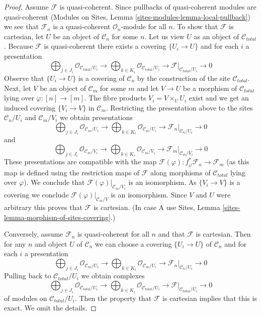 \begin{proof}
Assume $\mathcal{F}$ is quasi-coherent. Since pullbacks of
quasi-coherent modules are quasi-coherent
(Modules on Sites, Lemma \ref{sites-modules-lemma-local-pullback})
we see that $\mathcal{F}_n$ is a quasi-coherent $\mathcal{O}_n$-module
for all $n$. To show that $\mathcal{F}$ is cartesian, let $U$
be an object of $\mathcal{C}_n$ for some $n$. Let us view $U$
as an object of $\mathcal{C}_{total}$. Because $\mathcal{F}$
is quasi-coherent there exists a covering $\{U_i \to U\}$
and for each $i$ a presentation
$$
\bigoplus\nolimits_{j \in J_i} \mathcal{O}_{\mathcal{C}_{total}/U_i} \to
\bigoplus\nolimits_{k \in K_i} \mathcal{O}_{\mathcal{C}_{total}/U_i} \to
\mathcal{F}|_{\mathcal{C}_{total}/U_i} \to 0
$$
Observe that $\{U_i \to U\}$ is a covering of $\mathcal{C}_n$ by
the construction of the site $\mathcal{C}_{total}$.
Next, let $V$ be an object of $\mathcal{C}_m$ for some $m$ and let
$V \to U$ be a morphism of $\mathcal{C}_{total}$ lying over
$\varphi : [n] \to [m]$. The fibre products $V_i = V \times_U U_i$
exist and we get an induced covering $\{V_i \to V\}$ in $\mathcal{C}_m$.
Restricting the presentation above to the sites
$\mathcal{C}_n/U_i$ and $\mathcal{C}_m/V_i$ we obtain
presentations
$$
\bigoplus\nolimits_{j \in J_i} \mathcal{O}_{\mathcal{C}_m/U_i} \to
\bigoplus\nolimits_{k \in K_i} \mathcal{O}_{\mathcal{C}_m/U_i} \to
\mathcal{F}_n|_{\mathcal{C}_n/U_i} \to 0
$$
and
$$
\bigoplus\nolimits_{j \in J_i} \mathcal{O}_{\mathcal{C}_m/V_i} \to
\bigoplus\nolimits_{k \in K_i} \mathcal{O}_{\mathcal{C}_m/V_i} \to
\mathcal{F}_m|_{\mathcal{C}_m/V_i} \to 0
$$
These presentations are compatible with the map
$\mathcal{F}(\varphi) : f_\varphi^*\mathcal{F}_n \to \mathcal{F}_m$
(as this map is defined using the restriction maps of $\mathcal{F}$
along morphisms of $\mathcal{C}_{total}$ lying over $\varphi$).
We conclude that $\mathcal{F}(\varphi)|_{\mathcal{C}_m/V_i}$
is an isomorphism. As $\{V_i \to V\}$ is a covering we conclude
$\mathcal{F}(\varphi)|_{\mathcal{C}_m/V}$ is an isomorphism.
Since $V$ and $U$ were arbitrary this proves that $\mathcal{F}$ is cartesian.
(In case A use Sites, Lemma \ref{sites-lemma-morphism-of-sites-covering}.)

\medskip\noindent
Conversely, assume $\mathcal{F}_n$ is quasi-coherent
for all $n$ and that $\mathcal{F}$ is cartesian.
Then for any $n$ and object $U$ of $\mathcal{C}_n$ we
can choose a covering $\{U_i \to U\}$ of $\mathcal{C}_n$
and for each $i$ a presentation
$$
\bigoplus\nolimits_{j \in J_i} \mathcal{O}_{\mathcal{C}_m/U_i} \to
\bigoplus\nolimits_{k \in K_i} \mathcal{O}_{\mathcal{C}_m/U_i} \to
\mathcal{F}_n|_{\mathcal{C}_n/U_i} \to 0
$$
Pulling back to $\mathcal{C}_{total}/U_i$ we obtain complexes
$$
\bigoplus\nolimits_{j \in J_i} \mathcal{O}_{\mathcal{C}_{total}/U_i} \to
\bigoplus\nolimits_{k \in K_i} \mathcal{O}_{\mathcal{C}_{total}/U_i} \to
\mathcal{F}|_{\mathcal{C}_{total}/U_i} \to 0
$$
of modules on $\mathcal{C}_{total}/U_i$. Then the property that
$\mathcal{F}$ is cartesian implies that this is exact.
We omit the details.
\end{proof}
